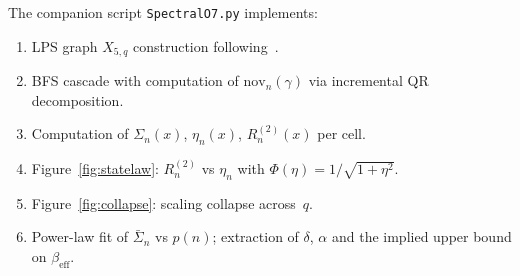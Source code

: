 \documentclass[11pt,a4paper]{article}
\theoremstyle{definition}
\theoremstyle{remark}
\newcommand{\beff}{\beta_{\mathrm{eff}}}
\newcommand{\nov}{\mathrm{nov}}
\begin{document}
  The companion script \texttt{SpectralO7.py} implements:
  \begin{enumerate}
    \item LPS graph $X_{5,q}$ construction following~\cite{LPS88}.
    \item BFS cascade with computation of $\nov_n(\gamma)$ via incremental QR decomposition.
    \item Computation of $\Sigma_n(x)$, $\eta_n(x)$, $R_n^{(2)}(x)$ per cell.
    \item Figure~\ref{fig:statelaw}: $R_n^{(2)}$ vs $\eta_n$ with $\Phi(\eta) = 1/\sqrt{1+\eta^2}$.
    \item Figure~\ref{fig:collapse}: scaling collapse across~$q$.
    \item Power-law fit of $\bar\Sigma_n$ vs $p(n)$; extraction of $\delta$, $\alpha$ and the implied
    upper bound on $\beff$.
  \end{enumerate}

  \clearpage
  
      
\end{document}
